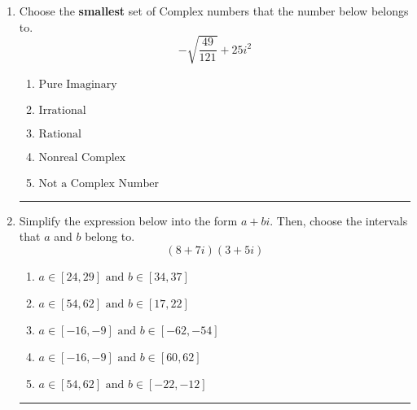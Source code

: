 \documentclass[14pt]{extbook}
\newcommand{\litem}[1]{\item#1\hspace*{-1cm}\rule{\textwidth}{0.4pt}}
\begin{document}
\begin{enumerate}
{\begin{enumerate}[label=\Alph*.]
\end{enumerate} }
\litem{
Choose the \textbf{smallest} set of Complex numbers that the number below belongs to.\[ -\sqrt{\frac{49}{121}} + 25i^2 \]\begin{enumerate}[label=\Alph*.]
\item \( \text{Pure Imaginary} \)
\item \( \text{Irrational} \)
\item \( \text{Rational} \)
\item \( \text{Nonreal Complex} \)
\item \( \text{Not a Complex Number} \)

\end{enumerate} }
\litem{
Simplify the expression below into the form $a+bi$. Then, choose the intervals that $a$ and $b$ belong to.\[ (8 + 7 i)(3 + 5 i) \]\begin{enumerate}[label=\Alph*.]
\item \( a \in [24, 29] \text{ and } b \in [34, 37] \)
\item \( a \in [54, 62] \text{ and } b \in [17, 22] \)
\item \( a \in [-16, -9] \text{ and } b \in [-62, -54] \)
\item \( a \in [-16, -9] \text{ and } b \in [60, 62] \)
\item \( a \in [54, 62] \text{ and } b \in [-22, -12] \)

\end{enumerate} }
\end{enumerate}
\end{document}
